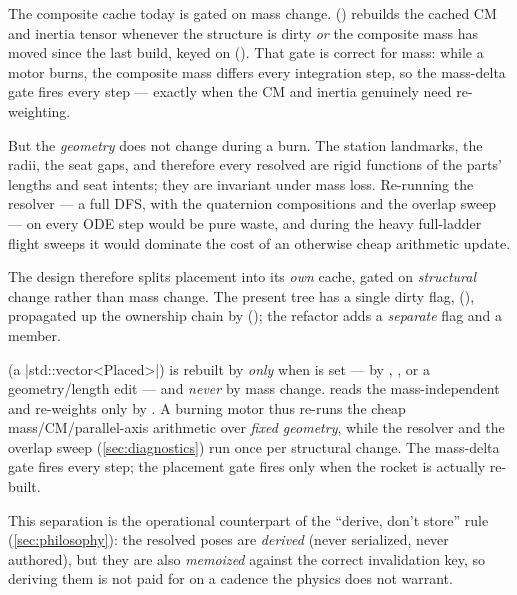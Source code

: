 The composite cache today is gated on mass change. 
() rebuilds the cached CM and inertia tensor whenever the structure is
dirty \emph{or} the composite mass has moved since the last build, keyed on 
(). That gate is correct for mass: while a motor burns, the composite
mass differs every integration step, so the mass-delta gate fires every step --- exactly when the
CM and inertia genuinely need re-weighting.

But the \emph{geometry} does not change during a burn. The station landmarks, the radii, the seat
gaps, and therefore every resolved  are rigid functions of the parts' lengths and seat
intents; they are invariant under mass loss. Re-running the resolver --- a full DFS, with the
quaternion compositions and the overlap sweep --- on every ODE step would be pure waste, and during
the heavy full-ladder flight sweeps it would dominate the cost of an otherwise cheap arithmetic
update.

The design therefore splits placement into its \emph{own} cache, gated on \emph{structural} change
rather than mass change. The present tree has a single dirty flag, 
(), propagated up the ownership chain by 
(); the refactor adds a \emph{separate}  flag and a
 member.

\begin{keyinsight}
 (a \cppinline|std::vector<Placed>|) is rebuilt by 
\emph{only} when  is set --- by , , or a
geometry/length edit --- and \emph{never} by mass change.  reads the
mass-independent  and re-weights only by . A burning motor thus
re-runs the cheap mass/CM/parallel-axis arithmetic over \emph{fixed geometry}, while the resolver and
the overlap sweep (\cref{sec:diagnostics}) run once per structural change. The mass-delta gate fires
every step; the placement gate fires only when the rocket is actually re-built.
\end{keyinsight}

This separation is the operational counterpart of the ``derive, don't store'' rule
(\cref{sec:philosophy}): the resolved poses are \emph{derived} (never serialized, never authored), but
they are also \emph{memoized} against the correct invalidation key, so deriving them is not paid for
on a cadence the physics does not warrant.
